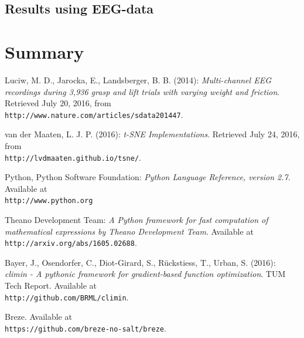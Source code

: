 \documentclass{article} %
\begin{document}
\subsection{Results using EEG-data}

\section{Summary}

\begin{thebibliography}{9}
	Luciw, M. D., Jarocka, E., Landsberger, B. B. (2014): 
	\textit{Multi-channel EEG recordings during 3,936 grasp and lift trials with varying weight and friction}. 
	 Retrieved July 20, 2016, from \\\texttt{http://www.nature.com/articles/sdata201447}.
	
	van der Maaten, L. J. P. (2016): 
	\textit{t-SNE Implementations}.
	Retrieved July 24, 2016, from \\\texttt{http://lvdmaaten.github.io/tsne/}.
	
	Python, Python Software Foundation:
	\textit{Python Language Reference, version 2.7}.
	Available at \\\texttt{http://www.python.org}
	
	Theano Development Team:
	\textit{A Python framework for fast computation of mathematical expressions by Theano Development Team}.
	Available at \\\texttt{http://arxiv.org/abs/1605.02688}.
	
	Bayer, J., Osendorfer, C., Diot-Girard, S., Rückstiess, T., Urban, S. (2016):
	\textit{climin - A pythonic framework for gradient-based function optimization}.
	 TUM Tech Report. Available at \\\texttt{http://github.com/BRML/climin}.
	 
	 Breze.
	 Available at \\\texttt{https://github.com/breze-no-salt/breze}.
\end{thebibliography}

\end{document}

